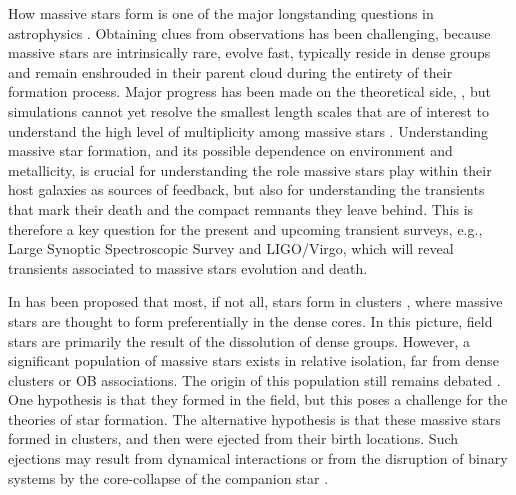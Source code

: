 \documentclass[apjl,twocolumn]{emulateapj}
\newcommand{\todo}[1]{{\large $\blacksquare$~\textbf{\color{red}[#1]}}~$\blacksquare$}
\begin{document}
How massive stars form is one of the major longstanding questions in astrophysics
\citep[e.g.,][]{zinnecker:07}. Obtaining clues from observations has been challenging, because massive stars are intrinsically rare, 
evolve fast, typically reside in dense groups and remain enshrouded in
their parent cloud during the entirety of their formation
process. Major progress has been made on the theoretical side,
\citep[e.g.][]{kuiper:15,rosen:16}, but simulations cannot yet resolve
the smallest length scales that are of interest to understand the 
high level of multiplicity among massive stars  \citep[e.g.,][]{bate:09, sana:17}. Understanding massive star formation, and its
possible dependence on environment and metallicity, is crucial for
understanding the role massive stars play within their host galaxies
as sources of feedback, but also for understanding the transients that
mark their death and the compact remnants they leave behind. This is
therefore a key question for the present and upcoming transient
surveys, e.g., Large Synoptic Spectroscopic Survey and LIGO/Virgo,
which  will reveal transients associated to massive stars
evolution and death.

In has been proposed that most, if not all, stars form in clusters \citep{lada:03}, where massive stars are thought to  form preferentially in the dense cores. In this picture, field stars are primarily the result of the dissolution of dense groups. 
However, a significant population of massive stars exists in relative
isolation,  far from dense clusters or OB associations. The origin of
this population still remains debated \citep{gvaramadze:12, lamb:16,ward:18}.  One
hypothesis is that they  formed in the field, but this poses a
challenge for the theories of star formation. The alternative
hypothesis is that these massive stars formed in clusters, and then
were ejected from their birth locations. Such ejections may result
from dynamical interactions \citep[e.g.,][]{poveda:67} or from the
disruption of binary systems by the core-collapse of the companion
star \citep[e.g.,][]{zwicky:57, blaauw:61, renzo:18}. 
\end{document}
